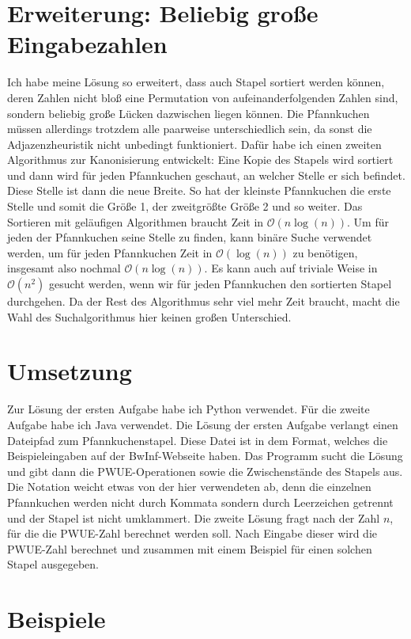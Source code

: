 \documentclass[a4paper,10pt,ngerman]{scrartcl}
\begin{document}
  \section{Erweiterung: Beliebig große Eingabezahlen}
  Ich habe meine Lösung so erweitert, dass auch Stapel sortiert werden können,
  deren Zahlen nicht bloß eine Permutation von aufeinanderfolgenden Zahlen sind,
  sondern beliebig große Lücken dazwischen liegen können. Die Pfannkuchen müssen
  allerdings trotzdem alle paarweise unterschiedlich sein, da sonst die
  Adjazenzheuristik nicht unbedingt funktioniert. Dafür habe ich einen zweiten
  Algorithmus zur Kanonisierung entwickelt: Eine Kopie des Stapels wird sortiert
  und dann wird für jeden Pfannkuchen geschaut, an welcher Stelle er sich
  befindet. Diese Stelle ist dann die neue Breite. So hat der kleinste
  Pfannkuchen die erste Stelle und somit die Größe 1, der zweitgrößte Größe 2 und
  so weiter. Das Sortieren mit geläufigen Algorithmen braucht Zeit in
$\mathcal{O}(n \log(n))$. Um für jeden der Pfannkuchen seine Stelle zu finden,
  kann binäre Suche verwendet werden, um für jeden Pfannkuchen Zeit in
$\mathcal{O}(\log(n))$ zu benötigen, insgesamt also nochmal $\mathcal{O}(n
\log(n))$. Es kann auch auf triviale Weise in $\mathcal{O}(n^2)$ gesucht
  werden, wenn wir für jeden Pfannkuchen den sortierten Stapel durchgehen. Da der
  Rest des Algorithmus sehr viel mehr Zeit braucht, macht die Wahl des
  Suchalgorithmus hier keinen großen Unterschied.
  \section{Umsetzung}
  Zur Lösung der ersten Aufgabe habe ich Python verwendet. Für die zweite Aufgabe
  habe ich Java verwendet. Die Lösung der ersten Aufgabe verlangt einen Dateipfad
  zum Pfannkuchenstapel. Diese Datei ist in dem Format, welches die
  Beispieleingaben auf der BwInf-Webseite haben. Das Programm sucht die Lösung
  und gibt dann die PWUE-Operationen sowie die Zwischenstände des Stapels aus.
  Die Notation weicht etwas von der hier verwendeten ab, denn die einzelnen
  Pfannkuchen werden nicht durch Kommata sondern durch Leerzeichen getrennt und
  der Stapel ist nicht umklammert. Die zweite Lösung fragt nach der Zahl $n$, für
die die PWUE-Zahl berechnet werden soll. Nach Eingabe dieser wird die PWUE-Zahl
berechnet und zusammen mit einem Beispiel für einen solchen Stapel ausgegeben.
\section{Beispiele}
\end{document}
